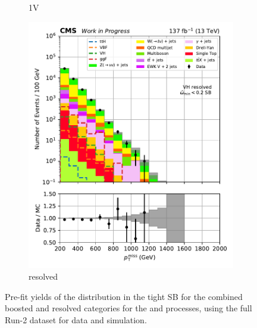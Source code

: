 \begin{figure}[htbp]
\begin{subfigure}[b]{0.24\textwidth}
        \caption{\VH 1V}
    \end{subfigure}
    \hfill
    \begin{subfigure}[b]{0.24\textwidth}
        \includegraphics[width=\textwidth]{figures/region_plots/full_Run2/sideband_3/VH_resolved.pdf}
        \caption{\VH resolved}
    \end{subfigure}
    \caption[Pre-fit yields of the \ptmiss distribution in the tight \omegaTilde sideband for the combined boosted and resolved categories for the \ttH and \VH processes, using the full Run-2 dataset for data and simulation]{Pre-fit yields of the \ptmiss distribution in the tight \omegaTilde \gls{SB} for the combined boosted and resolved categories for the \ttH and \VH processes, using the full Run-2 dataset for data and simulation.}
    \label{fig:htoinv_sb_yields_comb2016to18_tight_minOmegaTilde}
\end{figure}

